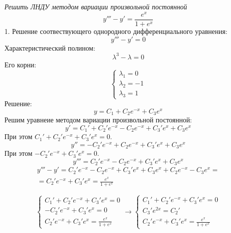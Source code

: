 \documentclass[a5paper, 10pt]{article}
\theoremstyle{definition}
\theoremstyle{plain}
\theoremstyle{remark}
\begin{document}
\section{}
\textit{Решить ЛНДУ методом вариации произвольной постоянной}
\\
\begin{equation}
y''' -y' = \frac{e^x}{1+e^x}
\end{equation}
1. Решение соотвествующего однородного дифференциального уравнения:
\begin{equation}
y''' -y' = 0
\end{equation}
Характеристический полином:
\begin{equation}
\lambda^3 -\lambda = 0
\end{equation}
Его корни:
\begin{equation}
\begin{cases}
\lambda_1 = 0\\
\lambda_2 = -1\\
\lambda_3 = 1
\end{cases}
\end{equation}
Решение:
\begin{equation}
y = C_1 + C_2e^{-x} + C_3 e^{x}
\end{equation}
Решим уравнеие методом вариации произвольной постоянной:
\begin{equation}
y' = C_1' + C_2'e^{-x} -C_2e^{-x} + C_3' e^{x}+ C_3 e^{x}
\end{equation}
При этом $C_1' + C_2'e^{-x}+ C_3' e^{x} = 0$.
\begin{equation}
y'' = -C_2'e^{-x} + C_2e^{-x} + C_3' e^{x}+ C_3 e^{x}
\end{equation}
При этом $- C_2'e^{-x}+ C_3' e^{x} = 0$.
\begin{equation}
y''' = C_2'e^{-x} - C_2e^{-x} + C_3' e^{x}+ C_3 e^{x}
\end{equation}
\begin{multline}
y''' -y' = C_2'e^{-x} - C_2e^{-x} + C_3' e^{x}+ C_3 e^{x} + C_2e^{-x} - C_3 e^{x} =\\=  C_2'e^{-x}+ C_3' e^{x} = \frac{e^x}{1+e^x}
\end{multline}

\begin{equation}
\begin{cases}
C_1' + C_2'e^{-x}+ C_3' e^{x} = 0\\
- C_2'e^{-x}+ C_3' e^{x} = 0\\
C_2'e^{-x}+ C_3' e^{x} = \frac{e^x}{1+e^x}
\end{cases}
\to
\begin{cases}
C_1' + C_2'e^{-x}+ C_3' e^{x} = 0\\
C_3' e^{2x} =  C_2'\\
C_2'e^{-x}+ C_3' e^{x} = \frac{e^x}{1+e^x}
\end{cases}
\end{equation}
\end{document}
